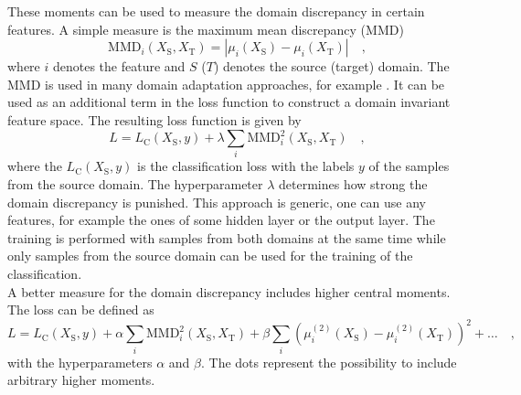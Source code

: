 These moments can be used to measure the domain discrepancy in certain features. A simple measure is the maximum mean discrepancy (MMD) \cite{MME} 
\begin{equation}
\textrm{MMD}_i(X_\textrm{S},X_\textrm{T}) = \left|\mu_{i}(X_\textrm{S}) - \mu_{i}(X_\textrm{T}) \right| \quad ,
\end{equation}
where $i$ denotes the feature and $S$ ($T$) denotes the source (target) domain. The MMD is used in many domain adaptation approaches, for example \cite{DDE}. It can be used as an additional term in the loss function to construct a domain invariant feature space. The resulting loss function is given by
\begin{equation}
L = L_\textrm{C}(X_\textrm{S},y) + \lambda \sum_i \textrm{MMD}_i^2(X_\textrm{S},X_\textrm{T}) \quad ,
\end{equation}
where the $L_\textrm{C}(X_\textrm{S},y)$ is the classification loss with the labels $y$ of the samples from the source domain. The hyperparameter $\lambda$ determines how strong the domain discrepancy is punished. This approach is generic, one can use any features, for example the ones of some hidden layer or the output layer. The training is performed with samples from both domains at the same time while only samples from the source domain can be used for the training of the classification. \\

A better measure for the domain discrepancy includes higher central moments. The loss can be defined as 
\begin{equation}
L = L_\textrm{C}(X_\textrm{S},y) + \alpha \sum_i \textrm{MMD}_i^2(X_\textrm{S},X_\textrm{T}) + \beta \sum_i \left( \mu^{(2)}_{i}(X_\textrm{S}) - \mu^{(2)}_{i}(X_\textrm{T}) \right)^2 + \dots \quad ,
\end{equation}
with the hyperparameters $\alpha$ and $\beta$. The dots represent the possibility to include arbitrary higher moments. 


